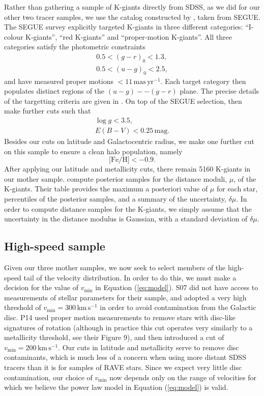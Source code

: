 \documentclass[useAMS,twocolumn,usenatbib]{mn2e}
\def\kms{{\,\mathrm{km\,s^{-1}}}}
\begin{document}
Rather than gathering a sample of K-giants directly from SDSS, as we did for our other two tracer samples, we use the catalog constructed by \cite{Xu14}, taken from SEGUE. 
The SEGUE survey \citep{Ya09} explicitly targeted K-giants in three different categories: ``I-colour K-giants'', ``red K-giants'' and ``proper-motion K-giants''. 
All three categories satisfy the photometric constraints
%
\begin{gather}
0.5 < (g-r)_0 < 1.3, \nonumber \\
0.5 < (u-g)_0 < 2.5,
\end{gather}
%
and have measured proper motions $<11 \,\mathrm{mas\,yr^{-1}}$. 
Each target category then populates distinct regions of the $(u-g)--(g-r)$ plane. 
The precise details of the targetting criteria are given in \cite{Ya09}. On top of the SEGUE selection, \citeauthor{Xu14} then make further cuts such that
%
\begin{gather}
\log g < 3.5, \nonumber \\
E(B-V) < 0.25 \,\mathrm{mag}. \nonumber
\end{gather}
%
Besides our cuts on latitude and Galactocentric radius, we make one further cut on this sample to ensure a clean halo population, namely
%
\begin{equation}
\lbrack \mathrm{Fe/H} \rbrack < -0.9.
\end{equation}
%
After applying our latitude and metallicity cuts, there remain 5160 K-giants in our mother sample. 
\citeauthor{Xu14} compute posterior samples for the distance moduli, $\mu$, of the K-giants. 
Their table provides the maximum a posteriori value of $\mu$ for each star, percentiles of the posterior samples, and a summary of the uncertainty, $\delta \mu$. 
In order to compute distance samples for the K-giants, we simply assume that the uncertainty in the distance modulus is Gaussian, with a standard deviation of $\delta\mu$.

\subsection{High-speed sample}

Given our three mother samples, we now seek to select members of the high-speed tail of the velocity distribution. 
In order to do this, we must make a decision for the value of $v_\mathrm{min}$ in Equation (\ref{eq:model}). 
S07 did not have access to measurements of stellar parameters for their sample, and adopted a very high threshold of $v_\mathrm{min} = 300\kms$ in order to avoid contamination from the Galactic disc. 
P14 used proper motion measurements to remove stars with disc-like signatures of rotation (although in practice this cut operates very similarly to a metallicity threshold, see their Figure 9), and then introduced a cut of $v_\mathrm{min}=200\kms$. 
Our cuts in latitude and metallicity serve to remove disc contaminants, which is much less of a concern when using more distant SDSS tracers than it is for samples of RAVE stars. 
Since we expect very little disc contamination, our choice of $v_\mathrm{min}$ now depends only on the range of velocities for which we believe the power law model in Equation (\ref{eq:model}) is valid.
\end{document}
